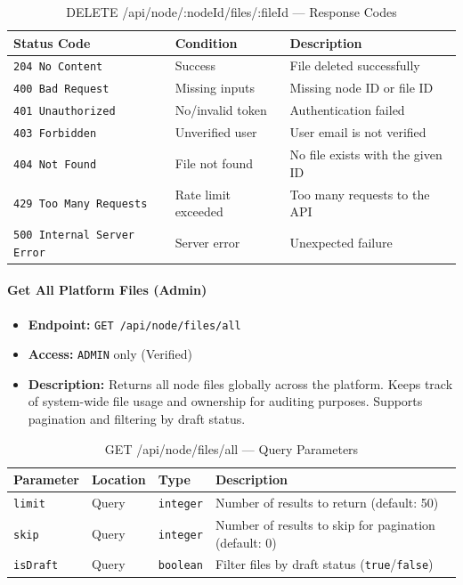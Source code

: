 \begin{table}[H]
\centering
\renewcommand{\arraystretch}{1.3}
\begin{tabularx}{\textwidth}{|l|l|X|}
\hline
\textbf{Status Code} & \textbf{Condition} & \textbf{Description} \\
\hline
\texttt{204 No Content}   & Success          & File deleted successfully \\
\hline
\texttt{400 Bad Request}  & Missing inputs   & Missing node ID or file ID \\
\hline
\texttt{401 Unauthorized} & No/invalid token & Authentication failed \\
\hline
\texttt{403 Forbidden}    & Unverified user  & User email is not verified \\
\hline
\texttt{404 Not Found}    & File not found   & No file exists with the given ID \\
\hline
\texttt{429 Too Many Requests} & Rate limit exceeded & Too many requests to the API \\
\hline
\texttt{500 Internal Server Error} & Server error & Unexpected failure \\
\hline
\end{tabularx}
\caption{DELETE /api/node/:nodeId/files/:fileId — Response Codes}
\label{tab:delete-single-node-file-responses}
\end{table}
\FloatBarrier

\paragraph{Get All Platform Files (Admin)}
\label{subsubsec:get-all-platform-files}

\begin{itemize}
  \item \textbf{Endpoint:} \texttt{GET /api/node/files/all}
  \item \textbf{Access:} \texttt{ADMIN} only (Verified)
  \item \textbf{Description:} Returns all node files globally across the platform. Keeps track of system-wide file usage and ownership for auditing purposes. Supports pagination and filtering by draft status.
\end{itemize}

\begin{table}[H]
\centering
\renewcommand{\arraystretch}{1.3}
\begin{tabularx}{\textwidth}{|l|l|l|X|}
\hline
\textbf{Parameter} & \textbf{Location} & \textbf{Type} & \textbf{Description} \\
\hline
\texttt{limit}   & Query & \texttt{integer} & Number of results to return (default: 50) \\
\hline
\texttt{skip}    & Query & \texttt{integer} & Number of results to skip for pagination (default: 0) \\
\hline
\texttt{isDraft} & Query & \texttt{boolean} & Filter files by draft status (\texttt{true}/\texttt{false}) \\
\hline
\end{tabularx}
\caption{GET /api/node/files/all — Query Parameters}
\label{tab:get-all-platform-files-params}
\end{table}

